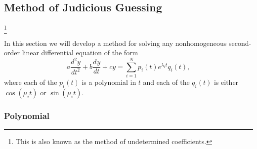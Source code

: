 \documentclass{myart}
\newcommand{\deriv}[3][]{\frac{d^{#1}#2}{d#3^{#1}}}
\begin{document}
\subsection{Method of Judicious Guessing}\footnote{This is also known as the method of undetermined coefficients.} \label{subsec:judicious guessing}

In this section we will develop a method for solving any nonhomogeneous second-order linear differential equation of the form
\begin{equation*}
a \deriv[2]{y}{t} + b \deriv{y}{t} + cy = \sum_{i=1}^N p_i(t)e^{\lambda_i t}q_i(t),
\end{equation*}
where each of the $p_i(t)$ is a polynomial in $t$ and each of the $q_i(t)$ is either $\cos(\mu_i t)$ or $\sin(\mu_i t)$.

\subsubsection{Polynomial} \label{subsubsec:judicious guessing polynomial}
\end{document}
